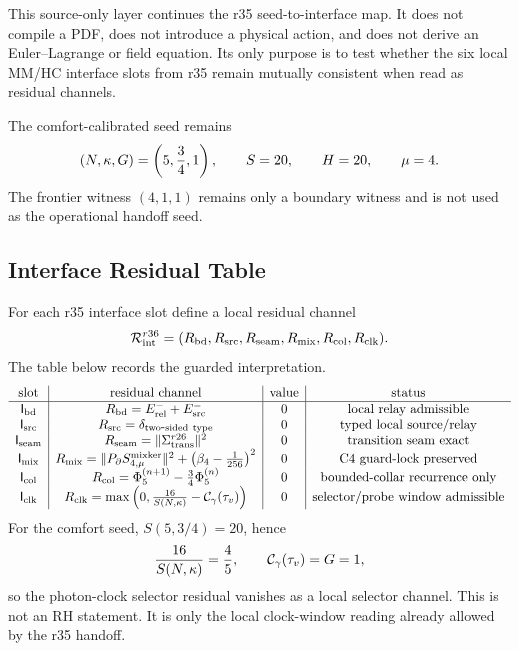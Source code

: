 This source-only layer continues the r35 seed-to-interface map.  It does not
compile a PDF, does not introduce a physical action, and does not derive an
Euler--Lagrange or field equation.  Its only purpose is to test whether the six
local MM/HC interface slots from r35 remain mutually consistent when read as
residual channels.

The comfort-calibrated seed remains
\[
(N,\kappa,G)=\left(5,{3\over4},1\right),
\qquad
S=20,
\qquad
H=20,
\qquad
\mu=4.
\]
The frontier witness \((4,1,1)\) remains only a boundary witness and is not used
as the operational handoff seed.

\subsection{Interface Residual Table}
\label{subsec:r36-interface-residual-table}

For each r35 interface slot define a local residual channel
\[
\mathcal R_{\rm int}^{r36}
=
(R_{\rm bd},R_{\rm src},R_{\rm seam},R_{\rm mix},R_{\rm col},R_{\rm clk}).
\]
The table below records the guarded interpretation.
\[
\begin{array}{c|c|c|c}
\hbox{slot} & \hbox{residual channel} & \hbox{value} & \hbox{status}\\
\hline
\mathsf I_{\rm bd}
& R_{\rm bd}=E_{\rm rel}^{-}+E_{\rm src}^{-}
&0&\hbox{local relay admissible}\\
\mathsf I_{\rm src}
& R_{\rm src}=\delta_{\rm two\mbox{-}sided\ type}
&0&\hbox{typed local source/relay}\\
\mathsf I_{\rm seam}
& R_{\rm seam}=\|\Sigma_{\rm trans}^{r26}\|^2
&0&\hbox{transition seam exact}\\
\mathsf I_{\rm mix}
& R_{\rm mix}=\|P_{\partial}S_{4,\mu}^{\rm mixker}\|^2+
\left(\beta_4-{1\over256}\right)^2
&0&\hbox{C4 guard-lock preserved}\\
\mathsf I_{\rm col}
& R_{\rm col}=\Phi_5^{(n+1)}-{3\over4}\Phi_5^{(n)}
&0&\hbox{bounded-collar recurrence only}\\
\mathsf I_{\rm clk}
& R_{\rm clk}=\max\left(0,{16\over S(N,\kappa)}-\mathcal C_\gamma(\tau_v)\right)
&0&\hbox{selector/probe window admissible}
\end{array}
\]
For the comfort seed, \(S(5,3/4)=20\), hence
\[
{16\over S(N,\kappa)}={4\over5},
\qquad
\mathcal C_\gamma(\tau_v)=G=1,
\]
so the photon-clock selector residual vanishes as a local selector channel.
This is not an RH statement.  It is only the local clock-window reading already
allowed by the r35 handoff.


